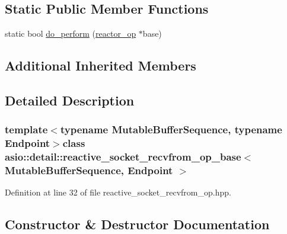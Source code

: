 \subsection*{Static Public Member Functions}
\begin{DoxyCompactItemize}
\item 
static bool \hyperlink{classasio_1_1detail_1_1reactive__socket__recvfrom__op__base_a0e62deb1e22019e3c06aba8653c92831}{do\+\_\+perform} (\hyperlink{classasio_1_1detail_1_1reactor__op}{reactor\+\_\+op} $\ast$base)
\end{DoxyCompactItemize}
\subsection*{Additional Inherited Members}


\subsection{Detailed Description}
\subsubsection*{template$<$typename Mutable\+Buffer\+Sequence, typename Endpoint$>$class asio\+::detail\+::reactive\+\_\+socket\+\_\+recvfrom\+\_\+op\+\_\+base$<$ Mutable\+Buffer\+Sequence, Endpoint $>$}



Definition at line 32 of file reactive\+\_\+socket\+\_\+recvfrom\+\_\+op.\+hpp.



\subsection{Constructor \& Destructor Documentation}
\hypertarget{classasio_1_1detail_1_1reactive__socket__recvfrom__op__base_a19f1ee615567314a7c4ae94dbd9c24da}{}
